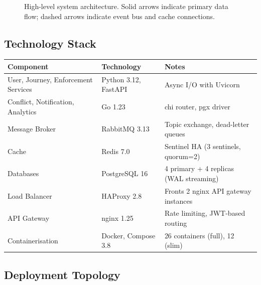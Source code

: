 \documentclass[12pt,a4paper]{article}
\begin{document}
\begin{figure}[H]
\caption{High-level system architecture. Solid arrows indicate primary data flow; dashed arrows indicate event bus and cache connections.}
\end{figure}

\subsection{Technology Stack}

\begin{table}[H]
\centering\small
\begin{tabularx}{\textwidth}{l l X}
  \toprule
  \textbf{Component} & \textbf{Technology} & \textbf{Notes} \\
  \midrule
  User, Journey, Enforcement Services & Python 3.12, FastAPI & Async I/O with Uvicorn \\
  Conflict, Notification, Analytics   & Go 1.23              & chi router, pgx driver \\
  Message Broker       & RabbitMQ 3.13        & Topic exchange, dead-letter queues \\
  Cache                & Redis 7.0            & Sentinel HA (3 sentinels, quorum=2) \\
  Databases            & PostgreSQL 16        & 4 primary + 4 replicas (WAL streaming) \\
  Load Balancer        & HAProxy 2.8          & Fronts 2 nginx API gateway instances \\
  API Gateway          & nginx 1.25           & Rate limiting, JWT-based routing \\
  Containerisation     & Docker, Compose 3.8  & 26 containers (full), 12 (slim) \\
  \bottomrule
\end{tabularx}
\end{table}

\subsection{Deployment Topology}
\end{document}
